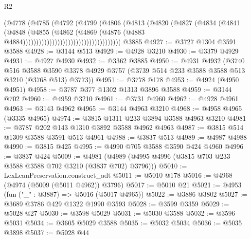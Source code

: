 \begin{lexlean}{R2}
\begin{coremodule}
                                              (@4778
                                                (@4785
                                                  (@4792
                                                    (@4799
                                                      (@4806
                                                        (@4813
                                                          (@4820
                                                            (@4827
                                                              (@4834
                                                                (@4841
                                                                  (@4848
                                                                    (@4855
                                                                      (@4862
                                                                        (@4869
                                                                          (@4876
                                                                            (@4883
                                                                              @4884)))))))))))))))))))))))))))))))))))))
    @3885
@4927 := @3727 @1304 @3591 @3588
@4928 := @3144 @513
@4929 := @4928 @3210
@4930 := @3379 @4929
@4931 := @4927 @4930
@4932 := @3362 @3885
@4950 := @4931
    @4932
    (@3740
      @516
      @3588
      @3590
      @3378
      @4929
      @3757
      (@3739 @514 @233 @3588 @3588 @513 @3210 (@3768 @513) @3773))
@4951 := @3778 @178
@4953 := @4924 (@4950 @4951)
@4958 := @3787 @377 @1302 @1313 @3896 @3588
@4959 := @3144 @702
@4960 := @4959 @3210
@4961 := @3731 @4960
@4962 := @4928 @4961
@4963 := @3143 @4962
@4965 := @3144 @4963 @3210
@4968 := @4958 @4965 (@3335 @4965)
@4974 := @3815 @1311 @233 @3894 @3588 @4963 @3210
@4981 := @3787 @202 @143 @1310 @3892 @3588 @4962 @4963
@4987 := @3815 @514 @1309 @3588 @3591 @513 @4961
@4988 := @3837 @513
@4989 := @4987 @4988
@4990 := @3815 @425
@4995 := @4990 @705 @3588 @3590 @424 @4960
@4996 := @3837 @424
@5009 := @4981 (@4989 (@4995 @4996 (@3815 @703 @233 @3588 @3588 @702 @3210 (@3837 @702) @3796)))
@5010 := LexLeanPreservation.construct_adt
@5011 := @5010 @178
@5016 := @4968 (@4974 (@5009 (@5011 @4962)) @3796)
@5017 := @5010 @21
@5021 := @4953 (fun ("_" : @3887) => @5016 (@5017 @4965))
@5022 := @3886 @3802
@5027 := @3689 @3786 @429 @1322 @1990 @3593
@5028 := @3599 @3359
@5029 := @5028 @27
@5030 := @3598 @5029
@5031 := @5030 @3588
@5032 := @3596 @5031
@5034 := @3605 @5029 @3588
@5035 := @5032 @5034
@5036 := @5035 @3898
@5037 := @5028 @44

\end{coremodule}
\end{lexlean}
